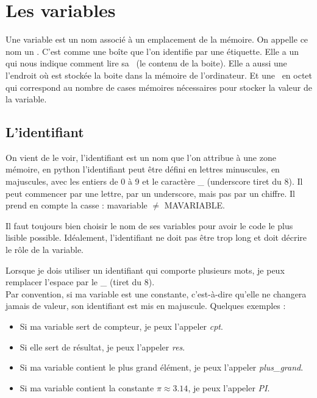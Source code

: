 \renewcommand{\chaptername}{\phantom{Chapitre}}\renewcommand{\thechapter}{}
\chapter{Les variables}
\renewcommand{\thesection}{\arabic{section}}

\begin{Definition}[Variable]
    Une variable est un nom associé à un emplacement de la mémoire.
    On appelle ce nom un .
    C’est comme une boîte que l’on identifie par une étiquette.
    Elle a un  qui nous indique comment lire sa~ (le contenu de la boite).
    Elle a aussi une~ l'endroit où est stockée la boite dans la mémoire de l'ordinateur.
    Et une~ en octet qui correspond au nombre de cases mémoires nécessaires pour stocker la valeur de la variable. 
\end{Definition}

\section*{L'identifiant}
On vient de le voir, l'identifiant est un nom que l'on attribue à une zone mémoire, en python l'identifiant peut être défini en lettres minuscules, en majuscules, avec les entiers de 0 à 9 et le caractère \_ (underscore tiret du 8).
Il peut commencer par une lettre, par un underscore, mais pas par un chiffre.
Il prend en compte la casse : mavariable $\ne$ MAVARIABLE.\\

\begin{Astuce}
    Il faut toujours bien choisir le nom de ses variables pour avoir le code le plus lisible possible.
    Idéalement, l'identifiant ne doit pas être trop long et doit décrire le rôle de la variable.

    Lorsque je dois utiliser un identifiant qui comporte plusieurs mots, je peux remplacer l'espace par le \_ (tiret du 8).\\
    Par convention, si ma variable est une constante, c'est-à-dire qu'elle ne changera jamais de valeur, son identifiant est mis en majuscule.
    Quelques exemples :
    \begin{itemize}
        \item Si ma variable sert de compteur, je peux l'appeler \textit{cpt}.
        \item Si elle sert de résultat, je peux l'appeler \textit{res}.
        \item Si ma variable contient le plus grand élément, je peux l'appeler \textit{plus\_grand}.
        \item Si ma variable contient la constante $\pi\approx3.14$, je peux l'appeler \textit{PI}.
    \end{itemize}
\end{Astuce}

